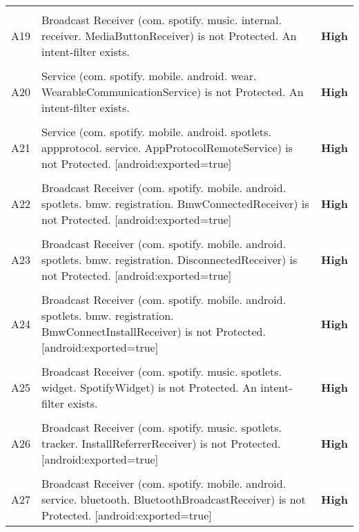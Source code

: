 \documentclass[12p]{article}
\begin{document}
\begin{longtable}{p{0.5cm} p{10cm} p{1.5cm}}
\hline\\	A19&Broadcast Receiver \newline (com. spotify. music. internal. receiver. MediaButtonReceiver) is not Protected. An intent-filter exists.& \color{ferrarired}\textbf{High} \\
\hline\\	A20&Service \newline (com. spotify. mobile. android. wear. WearableCommunicationService) is not Protected. An intent-filter exists.& \color{ferrarired}\textbf{High} \\
\hline\\	A21&Service \newline (com. spotify. mobile. android. spotlets. appprotocol. service. AppProtocolRemoteService) is not Protected. [android:exported=true]& \color{ferrarired}\textbf{High} \\
\hline\\	A22&Broadcast Receiver \newline (com. spotify. mobile. android. spotlets. bmw. registration. BmwConnectedReceiver) is not Protected. [android:exported=true]& \color{ferrarired}\textbf{High} \\
\hline\\	A23&Broadcast Receiver \newline (com. spotify. mobile. android. spotlets. bmw. registration. DisconnectedReceiver) is not Protected. [android:exported=true]& \color{ferrarired}\textbf{High} \\
\hline\\	A24&Broadcast Receiver \newline (com. spotify. mobile. android. spotlets. bmw. registration. BmwConnectInstallReceiver) is not Protected. [android:exported=true]& \color{ferrarired}\textbf{High} \\
\hline\\	A25&Broadcast Receiver \newline (com. spotify. music. spotlets. widget. SpotifyWidget) is not Protected. An intent-filter exists.& \color{ferrarired}\textbf{High} \\
\hline\\	A26&Broadcast Receiver \newline (com. spotify. music. spotlets. tracker. InstallReferrerReceiver) is not Protected. [android:exported=true]& \color{ferrarired}\textbf{High} \\
\hline\\	A27&Broadcast Receiver \newline (com. spotify. mobile. android. service. bluetooth. BluetoothBroadcastReceiver) is not Protected. [android:exported=true]& \color{ferrarired}\textbf{High} \\

\end{longtable}
\end{document}
